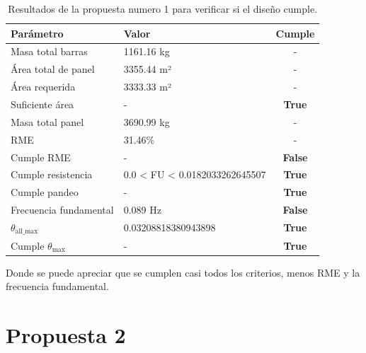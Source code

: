 \begin{table}[H]
    \centering
    \begin{tabular}{|l|l|c|}
    \hline
    \textbf{Parámetro}              & \textbf{Valor}                     & \textbf{Cumple} \\ \hline
    Masa total barras               & 1161.16 kg                         & -               \\ \hline
    Área total de panel             & 3355.44 m²                         & -               \\ \hline
    Área requerida                  & 3333.33 m²                         & -               \\ \hline
    Suficiente área                 & -                                   & \textbf{True}   \\ \hline
    Masa total panel                & 3690.99 kg                         & -               \\ \hline
    RME                             & 31.46\%                            & -               \\ \hline
    Cumple RME                      & -                                   & \textbf{False}  \\ \hline
    Cumple resistencia              & 0.0 < FU < 0.0182033262645507      & \textbf{True}   \\ \hline
    Cumple pandeo                   & -                                   & \textbf{True}   \\ \hline
    Frecuencia fundamental          & 0.089 Hz                           & \textbf{False}  \\ \hline
    $\theta_\text{all\_max}$        & 0.03208818380943898                & \textbf{True}   \\ \hline
    Cumple $\theta_\text{max}$      & -                                   & \textbf{True}   \\ \hline
    \end{tabular}
    \caption{Resultados de la propuesta numero 1 para verificar si el diseño cumple.}
    \label{tabla:modelo_h5_p1}
\end{table}
    
Donde se puede apreciar que se cumplen casi todos los criterios, menos RME y la frecuencia fundamental.


\newpage
\section{Propuesta 2}

